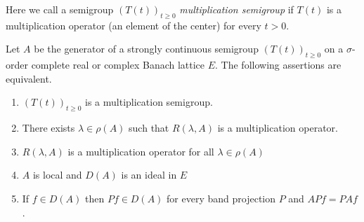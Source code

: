 Here we call a semigroup $(T(t))_{t \geq 0}$ \emph{multiplication semigroup} if\/ $T(t)$ is a multiplication operator (\ie an element of the center) for every $t > 0$.
\begin{theorem}\label{thm:c2-5.13}
%
Let $A$ be the generator of a strongly continuous semigroup $(T(t))_{t \geq 0}$ on a $\sigma$-order complete real or complex Banach lattice $E$.
The following assertions are equivalent.
\begin{enumerate}[\upshape (a)]
\item \label{thm:c2-5.13-1}
$(T(t))_{t \geq 0}$ is a multiplication semigroup.
\item \label{thm:c2-5.13-2}
There exists $\lambda \in \rho(A)$ such that $R(\lambda,A)$ is a multiplication operator.
\item \label{thm:c2-5.13-3}
$R(\lambda,A)$ is a multiplication operator for all $\lambda \in \rho(A)$
\item \label{thm:c2-5.13-4}
$A$ is local and $D(A)$ is an ideal in $E$
\item \label{thm:c2-5.13-5}
If\/ $f \in D(A)$ then $Pf \in D(A)$ for every band projection $P$ and $APf = PAf$.
\end{enumerate}
\end{theorem}

